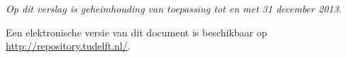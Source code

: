 \begin{titlepage}
\begin{center}
\bigskip
\bigskip
\emph{Op dit verslag is geheimhouding van toepassing tot en met 31 december 2013.}

\bigskip
\bigskip
Een elektronische versie van dit document is beschikbaar op \url{http://repository.tudelft.nl/}.

\end{center}

\end{titlepage}

